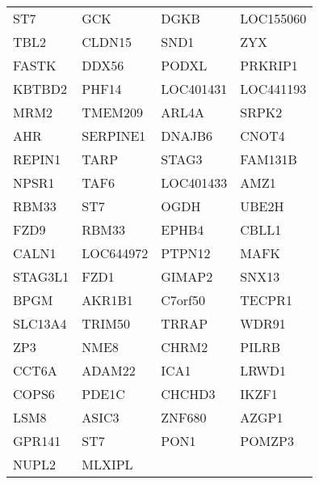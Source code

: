 {\begin{longtable}{llll}
ST7&GCK&DGKB&LOC155060\tabularnewline
TBL2&CLDN15&SND1&ZYX\tabularnewline
FASTK&DDX56&PODXL&PRKRIP1\tabularnewline
KBTBD2&PHF14&LOC401431&LOC441193\tabularnewline
MRM2&TMEM209&ARL4A&SRPK2\tabularnewline
AHR&SERPINE1&DNAJB6&CNOT4\tabularnewline
REPIN1&TARP&STAG3&FAM131B\tabularnewline
NPSR1&TAF6&LOC401433&AMZ1\tabularnewline
RBM33&ST7&OGDH&UBE2H\tabularnewline
FZD9&RBM33&EPHB4&CBLL1\tabularnewline
CALN1&LOC644972&PTPN12&MAFK\tabularnewline
STAG3L1&FZD1&GIMAP2&SNX13\tabularnewline
BPGM&AKR1B1&C7orf50&TECPR1\tabularnewline
SLC13A4&TRIM50&TRRAP&WDR91\tabularnewline
ZP3&NME8&CHRM2&PILRB\tabularnewline
CCT6A&ADAM22&ICA1&LRWD1\tabularnewline
COPS6&PDE1C&CHCHD3&IKZF1\tabularnewline
LSM8&ASIC3&ZNF680&AZGP1\tabularnewline
GPR141&ST7&PON1&POMZP3\tabularnewline
NUPL2&MLXIPL&&\tabularnewline
\bottomrule
\end{longtable}}
\addtocounter{table}{-1}

